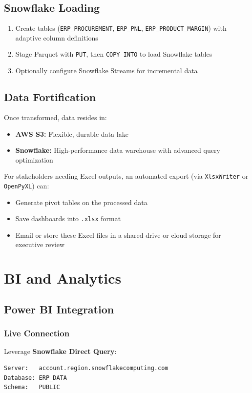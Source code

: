 \documentclass[a4paper,10pt]{article}
\begin{document}
\section{Snowflake Loading}
\begin{enumerate}[leftmargin=2em]
    \item Create tables (\texttt{ERP\_PROCUREMENT}, \texttt{ERP\_PNL}, \texttt{ERP\_PRODUCT\_MARGIN}) with adaptive column definitions
    \item Stage Parquet with \texttt{PUT}, then \texttt{COPY INTO} to load Snowflake tables
    \item Optionally configure Snowflake Streams for incremental data
\end{enumerate}

\section{Data Fortification}
Once transformed, data resides in:
\begin{itemize}[leftmargin=2em]
    \item \textbf{AWS S3:} Flexible, durable data lake
    \item \textbf{Snowflake:} High-performance data warehouse with advanced query optimization
\end{itemize}

For stakeholders needing Excel outputs, an automated export (via \texttt{XlsxWriter} or \texttt{OpenPyXL}) can:
\begin{itemize}[leftmargin=2em]
    \item Generate pivot tables on the processed data
    \item Save dashboards into \texttt{.xlsx} format
    \item Email or store these Excel files in a shared drive or cloud storage for executive review
\end{itemize}

\chapter{BI and Analytics}

\section{Power BI Integration}
\subsection{Live Connection}
Leverage \textbf{Snowflake Direct Query}:
\begin{verbatim}
Server:   account.region.snowflakecomputing.com
Database: ERP_DATA
Schema:   PUBLIC
\end{verbatim}
\end{document}
